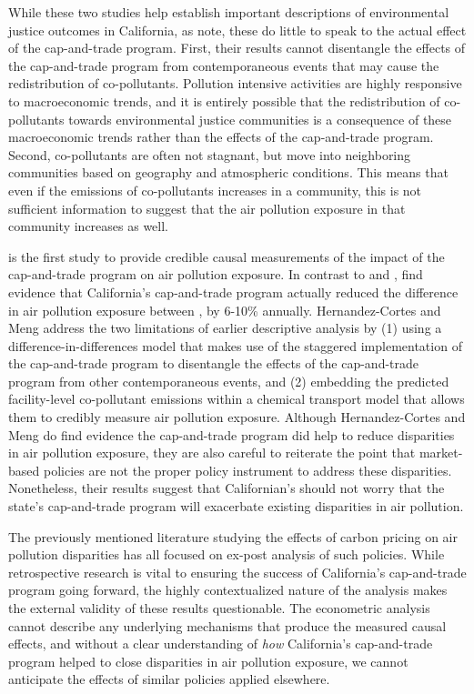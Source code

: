 \documentclass[11pt]{article}
\begin{document}
While these two studies help establish important descriptions of environmental justice outcomes in California, as \cite{hernandez2022importance} note, these do little to speak to the actual effect of the cap-and-trade program. First, their results cannot disentangle the effects of the cap-and-trade program from contemporaneous events that may cause the redistribution of co-pollutants. Pollution intensive activities are highly responsive to macroeconomic trends, and it is entirely possible that the redistribution of co-pollutants towards environmental justice communities is a consequence of these macroeconomic trends rather than the effects of the cap-and-trade program. Second, co-pollutants are often not stagnant, but move into neighboring communities based on geography and atmospheric conditions. This means that even if the emissions of co-pollutants increases in a community, this is not sufficient information to suggest that the air pollution exposure in that community increases as well. 

\cite{hernandez2023environmental} is the first study to provide credible causal measurements of the impact of the cap-and-trade program on air pollution exposure. In contrast to \cite{cushing2018carbon} and \cite{pastor2022up}, \cite{hernandez2023environmental} find evidence that California's cap-and-trade program actually reduced the difference in air pollution exposure between , by 6-10\% annually. Hernandez-Cortes and Meng address the two limitations of earlier descriptive analysis by (1) using a difference-in-differences model that makes use of the staggered implementation of the cap-and-trade program to disentangle the effects of the cap-and-trade program from other contemporaneous events, and (2) embedding the predicted facility-level co-pollutant emissions within a chemical transport model that allows them to credibly measure air pollution exposure. Although Hernandez-Cortes and Meng do find evidence the cap-and-trade program did help to reduce disparities in air pollution exposure, they are also careful to reiterate the point that market-based policies are not the proper policy instrument to address these disparities. Nonetheless, their results suggest that Californian's should not worry that the state's cap-and-trade program will exacerbate existing disparities in air pollution. 

The previously mentioned literature studying the effects of carbon pricing on air pollution disparities has all focused on ex-post analysis of such policies. While retrospective research is vital to ensuring the success of California's cap-and-trade program going forward, the highly contextualized nature of the analysis makes the external validity of these results questionable. The econometric analysis cannot describe any underlying mechanisms that produce the measured causal effects, and without a clear understanding of \emph{how} California's cap-and-trade program helped to close disparities in air pollution exposure, we cannot anticipate the effects of similar policies applied elsewhere. 
\end{document}
